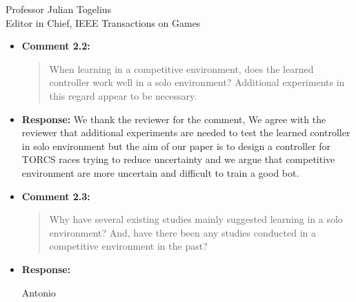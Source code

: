 \documentclass[10pt]{letter} %
\begin{document}
\begin{letter}{Professor Julian Togelius \\ Editor in Chief, IEEE Transactions on Games}
\begin{enumerate}
\begin{itemize}
\begin{itemize}
                        that is indeed a good suggestion for future
                        work, for which we are really grateful. For
                        the time being, that introduction of another
                        variable in the problem was not considered for
                        this paper.
		\item {\bf Comment 2.2:}
		\begin{quote}
When learning in a competitive environment, does the learned controller work well in a solo environment? Additional experiments in this regard appear to be necessary.
			\end{quote}	
		\item {\bf Response:} 
		We thank the reviewer for the comment, We agree with the reviewer that additional experiments are needed to test the learned controller in solo environment but the aim of our paper is to design a controller for TORCS races trying to reduce uncertainty and we argue that competitive environment are more uncertain and difficult to train a good bot.
		
		\item {\bf Comment 2.3:}
		\begin{quote}
Why have several existing studies mainly suggested learning in a solo environment? And, have there been any studies conducted in a competitive environment in the past?
			\end{quote}	
		\item {\bf Response:} 
		
		Antonio
		

\end{itemize}
\end{itemize}
\end{enumerate}
\end{letter}
\end{document}
